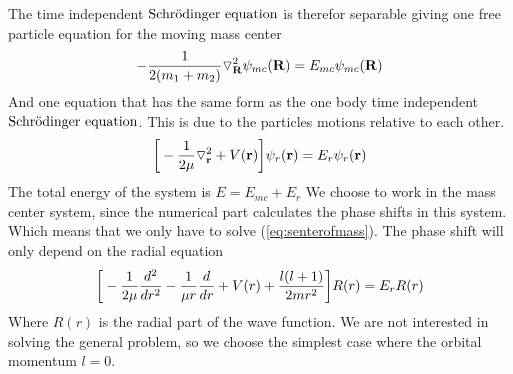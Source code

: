 The time independent $\text{Schr$\ddot{\textrm{o}}$dinger equation}$ is therefor separable giving one free particle equation for the moving
mass center
%
\begin{equation}
-\frac{1}{2(m_1+m_2)} {\bf \triangledown}^2_{\bf R} \psi_{mc}({\bf R})=E_{mc}\psi_{mc}({\bf R})
\end{equation}
%
And one equation that has the same form as the one body time independent $\text{Schr$\ddot{\textrm{o}}$dinger equation}$. This
is due to the particles motions relative to each other.
%
\begin{equation}\label{eq:senterofmass}
\bigg[-\frac{1}{2\mu} {\bf \triangledown}^2_{\bf r}+V({\bf r}) \bigg]\psi_r({\bf r})=E_{r}\psi_r({\bf r})
\end{equation}
%
The total energy of the system is $E=E_{mc}+E_{r}$
\nl
%
We choose to work in the mass center system, since the numerical part calculates the phase shifts in this system.
Which means that we only have to solve (\ref{eq:senterofmass}). The phase shift will only depend on the radial equation
\begin{equation}\label{eq:radialeguation} 
\bigg[-\frac{1}{2\mu} \frac{d^2}{dr^2}-\inv{\mu r}\frac{d}{dr}+V({ r})+\frac{l(l+1)}{2mr^2} \bigg]R({ r})=E_{r}R({ r})
\end{equation}
%
Where $R(r)$ is the radial part of the wave function.
We are not interested in solving the general problem, so we choose the simplest case where the orbital momentum $l=0$. 


